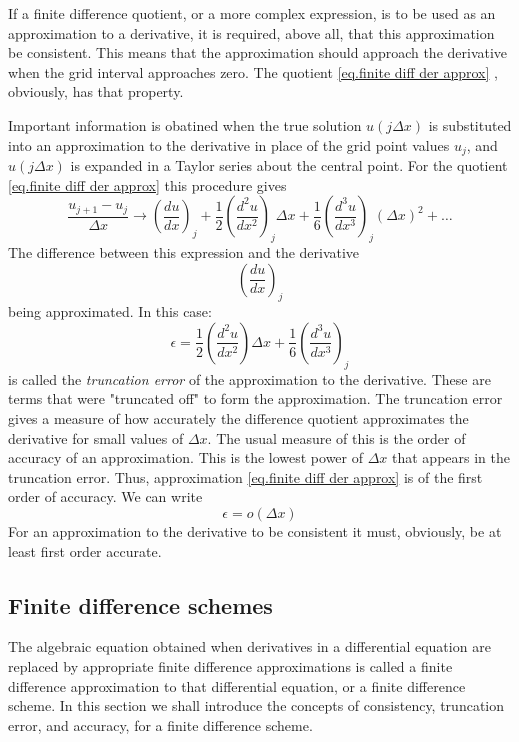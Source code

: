 If a finite difference quotient, or a more complex expression, is to be used as an approximation to a deri­vative, it is required, above all, that this approximation be consistent. This means that the approximation should approach the derivative when the grid interval approaches zero. The quotient \ref{eq.finite diff der approx} , obviously, has that property.

Important information is obatined when the true solution $u(j\Delta x)$ is substituted into an approximation to the derivative in place of the grid point values $u_j$, and$ u(j\Delta x)$ is expanded in a Taylor series about the central point. For the quotient \ref{eq.finite diff der approx} this procedure gives
\begin{equation}
	\frac{u_{j+1}-u_j}{\Delta x}\rightarrow\left(\frac{du}{dx}\right)_j+\frac{1}{2}\left(\frac{d^2u}{dx^2}\right)_j\Delta x+\frac{1}{6}\left(\frac{d^3u}{dx^3}\right)_j(\Delta x)^2+\dots
\end{equation}
The difference between this expression and the derivative $$\left(\frac{du}{dx}\right)_j$$ being approximated. In this case:
\begin{equation}
	\epsilon= \frac{1}{2}\left(\frac{d^2u}{dx^2}\right)\Delta x+\frac{1}{6}\left(\frac{d^3u}{dx^3}\right)_j
\end{equation}
is called the \textit{truncation error} of the approximation to the derivative. These are terms that were "truncated off" to form the approximation. The truncation error gives a measure of how accurately the difference quotient approximates the derivative for small values of $\Delta x$. The usual measure of this is the order of accuracy of an approximation. This is the lowest power of $\Delta x$ that appears in the truncation error. Thus, approximation \ref{eq.finite diff der approx}
is of the first order of accuracy. We can write
\begin{equation}
	\epsilon =o(\Delta x)
\end{equation}
For an approximation to the derivative to be consistent it must, obviously, be at least first order accurate.
\subsection{Finite difference schemes}
The algebraic equation obtained when derivatives in a differential equation are replaced by appropriate finite difference approximations is called a finite difference approximation to that differential equation, or a finite difference scheme. In this section we shall introduce the concepts of consistency, truncation error, and accuracy, for a finite difference scheme.

